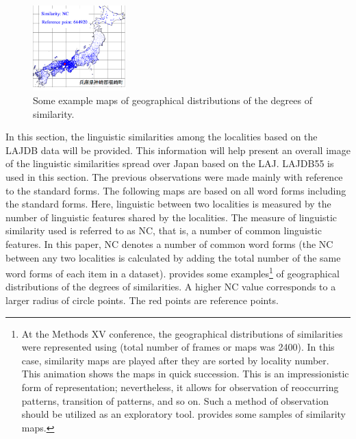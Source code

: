 \documentclass[output=paper]{LSP/langsci}
\begin{document}
\begin{figure}[b]
\includegraphics[width=0.32\textwidth]{illustrations/kuma_fig20-6}
\caption{Some example maps of geographical distributions of the degrees of similarity.}          
\label{fig:20}
\end{figure}
In this section, the linguistic similarities among the localities based on the LAJDB data will be provided. This information will help present an overall image of the linguistic similarities spread over Japan based on the LAJ. LAJDB55 is used in this section. The previous observations were made mainly with reference to the standard forms. The following maps are based on all word forms including the standard forms. Here, linguistic  between two localities is measured by the number of linguistic features shared by the localities. The measure of linguistic similarity used is referred to as NC, that is, a number of common linguistic features. In this paper, NC denotes a number of common word forms (the NC between any two localities is calculated by adding the total number of the same word forms of each item in a dataset).  provides some examples\footnote{At the Methods XV conference, the geographical distributions of similarities were represented using  (total number of frames or maps was 2400). In this case, similarity maps are played after they are sorted by locality number. This animation shows the maps in quick succession. This is an impressionistic form of representation; nevertheless, it allows for observation of reoccurring patterns, transition of patterns, and so on. Such a method of observation should be utilized as an exploratory tool.  provides some samples of similarity maps.} of geographical distributions of the degrees of similarities. A higher NC value corresponds to a larger radius of circle points. The red points are reference points.
\end{document}
